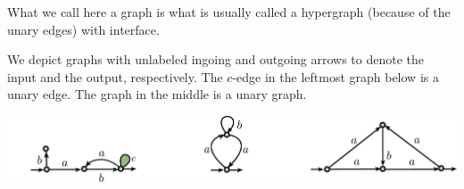    \begin{remark} What we call here a graph is what is usually called a hypergraph (because of the unary edges) with interface. 
   \end{remark}

\begin{example}\label{ex:graphs}  We depict graphs  with unlabeled ingoing and outgoing arrows to denote the input and the output, respectively.  The $c$-edge in the leftmost graph below is a unary edge.   The graph in the middle is a unary graph.
 \begin{center}
\includegraphics[scale=.35]{Pictures/example-graph}
 \end{center}
 \end{example}


